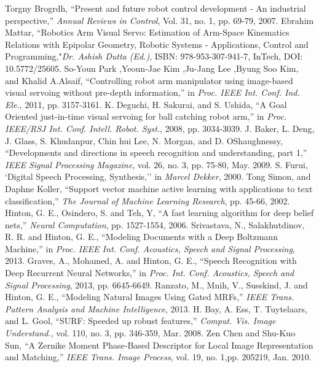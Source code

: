 \documentclass{tADR2e}
\begin{document}
\begin{thebibliography}{12}
 Torgny Brogrdh, ``Present and future robot control development - An industrial perspective,'' \textit{Annual Reviews in Control}, Vol. 31, no. 1, pp. 69-79, 2007.
 Ebrahim Mattar, ``Robotics Arm Visual Servo: Estimation of Arm-Space Kinematics Relations with Epipolar Geometry, Robotic Systems - Applications, Control and Programming,"\textit{Dr. Ashish Dutta (Ed.)}, ISBN: 978-953-307-941-7, InTech, DOI: 10.5772/25605.
 So-Youn Park ,Yeoun-Jae Kim ,Ju-Jang Lee ,Byung Soo Kim, and Khalid A.Alsaif, ``Controlling robot arm manipulator using image-based visual servoing without pre-depth information,'' in \textit{Proc. IEEE Int. Conf. Ind. Ele.}, 2011, pp. 3157-3161.
 K. Deguchi, H. Sakurai, and S. Ushida, ``A Goal Oriented just-in-time visual servoing for ball catching robot arm,'' in \textit{Proc. IEEE/RSJ Int. Conf. Intell. Robot. Syst.}, 2008, pp. 3034-3039.
 J. Baker, L. Deng, J. Glass, S. Khudanpur, Chin hui Lee, N. Morgan, and D. OShaughnessy, ``Developments and directions in speech recognition and understanding, part 1,'' \textit{IEEE Signal Processing Magazine}, vol. 26, no. 3, pp. 75-80, May. 2009.
 S. Furui, `Digital Speech Processing, Synthesis,'' in \textit{Marcel Dekker}, 2000.
 Tong Simon, and Daphne Koller, ``Support vector machine active learning with applications to text classification,'' \textit{The Journal of Machine Learning Research}, pp. 45-66, 2002.
 Hinton, G. E., Osindero, S. and Teh, Y, ``A fast learning algorithm for deep belief nets,'' \textit{Neural Computation}, pp. 1527-1554, 2006.
 Srivastava, N., Salakhutdinov, R. R. and Hinton, G. E., ``Modeling Documents with a Deep Boltzmann Machine,'' in \textit{Proc. IEEE Int. Conf. Acoustics, Speech and Signal Processing}, 2013.
 Graves, A., Mohamed, A. and Hinton, G. E., ``Speech Recognition with Deep Recurrent Neural Networks,'' in \textit{ Proc. Int. Conf. Acoustics, Speech and Signal Processing}, 2013, pp. 6645-6649. 
 Ranzato, M., Mnih, V., Susskind, J. and Hinton, G. E., ``Modeling Natural Images Using Gated MRFs,'' \textit{IEEE Trans. Pattern Analysis
and Machine Intelligence}, 2013.
 H. Bay, A. Ess, T. Tuytelaars, and L. Gool, ``SURF: Speeded up robust features,'' \textit{Comput. Vis. Image Understand.},  vol. 110, no. 3, pp. 346-359, Mar. 2008.
 Zen Chen and Shu-Kuo Sun, ``A Zernike Moment Phase-Based Descriptor for Local Image Representation and Matching,'' \textit{IEEE Trans. Image Process}, vol. 19, no. 1,pp. 205219, Jan. 2010.

\end{thebibliography}
\end{document}
